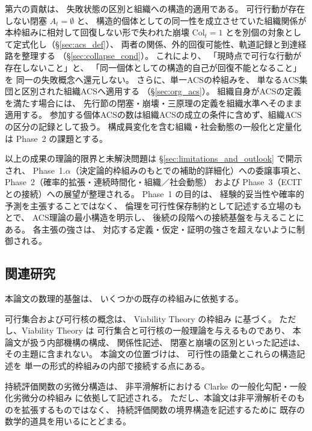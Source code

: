 第六の貢献は、
失敗状態の区別と組織への構造的適用である。
可行行動が存在しない閉塞
$A_t=\emptyset$
と、
構造的個体としての同一性を成立させていた組織関係が
本枠組みに相対して回復しない形で失われた崩壊
$\mathrm{Col}_t=1$
とを別個の対象として定式化し（\S\ref{sec:acs_def}）、
両者の関係、外的回復可能性、軌道記録と到達経路を整理する
（\S\ref{sec:collapse_cond}）。
これにより、
「現時点で可行な行動が存在しないこと」と、
「同一個体としての構造的自己が回復不能となること」を
同一の失敗概念へ還元しない。
さらに、単一ACSの枠組みを、
単なるACS集団と区別された組織ACSへ適用する
（\S\ref{sec:org_acs}）。
組織自身がACSの定義を満たす場合には、
先行節の閉塞・崩壊・三原理の定義を組織水準へそのまま適用する。
参加する個体ACSの数は組織ACSの成立の条件に含めず、組織ACSの区分の記録として扱う。
構成員変化を含む組織・社会動態の一般化と定量化は Phase~2 の課題とする。

以上の成果の理論的限界と未解決問題は
\S\ref{sec:limitations_and_outlook} で開示され、
Phase~1.$\alpha$（決定論的枠組みのもとでの補助的詳細化）への委譲事項と、
Phase~2（確率的拡張・連続時間化・組織／社会動態）
および Phase~3（ECITとの接続）への展望が整理される。
Phase~1 の目的は、
経験的妥当性や確率的予測を主張することではなく、
倫理を可行性保存制約として記述する立場のもとで、
ACS理論の最小構造を明示し、
後続の段階への接続基盤を与えることにある。
各主張の強さは、
対応する定義・仮定・証明の強さを超えないように制御される。

\subsection{関連研究}
\label{subsec:related}

本論文の数理的基盤は、
いくつかの既存の枠組みに依拠する。

可行集合および可行核の概念は、
Viability Theory の枠組み
\cite{Aubin1991,AubinFrankowska1990} に基づく。
ただし、Viability Theory は
可行集合と可行核の一般理論を与えるものであり、
本論文が扱う内部機構の構成、
関係性記述、
閉塞と崩壊の区別といった記述は、
その主題に含まれない。
本論文の位置づけは、
可行性の語彙とこれらの構造記述を
単一の形式的枠組みの内部で接続する点にある。

持続評価関数の劣微分構造は、
非平滑解析における
Clarke の一般化勾配・一般化劣微分の枠組み
\cite{Clarke1990} に依拠して記述される。
ただし、本論文は非平滑解析そのものを拡張するものではなく、
持続評価関数の境界構造を記述するために
既存の数学的道具を用いるにとどまる。


